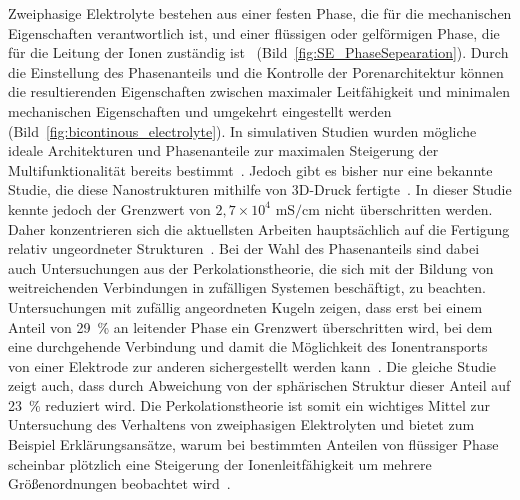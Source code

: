 Zweiphasige Elektrolyte bestehen aus einer festen Phase, die für die mechanischen Eigenschaften verantwortlich ist, und einer flüssigen oder gelförmigen Phase, die für die Leitung der Ionen zuständig ist~\cite{Ichino1995} (Bild~\ref{fig:SE_PhaseSepearation}). Durch die Einstellung des Phasenanteils und die Kontrolle der Porenarchitektur können die resultierenden Eigenschaften zwischen maximaler Leitfähigkeit und minimalen mechanischen Eigenschaften und umgekehrt eingestellt werden (Bild~\ref{fig:bicontinous_electrolyte}). In simulativen Studien wurden mögliche ideale Architekturen und Phasenanteile zur maximalen Steigerung der Multifunktionalität bereits bestimmt~\cite{Lee2019,Tu2020}. Jedoch gibt es bisher nur eine bekannte Studie, die diese Nanostrukturen mithilfe von 3D-Druck fertigte~\cite{Zekoll2018}. In dieser Studie kennte jedoch der Grenzwert von $2,7 \times 10^4$ $\si{\milli \siemens \per \cm}$ nicht überschritten werden. Daher konzentrieren sich die aktuellsten Arbeiten hauptsächlich auf die Fertigung relativ ungeordneter Strukturen~\cite{Greenhalgh2023}. Bei der Wahl des Phasenanteils sind dabei auch Untersuchungen aus der Perkolationstheorie, die sich mit der Bildung von weitreichenden Verbindungen in zufälligen Systemen beschäftigt, zu beachten. Untersuchungen mit zufällig angeordneten Kugeln zeigen, dass erst bei einem Anteil von 29~\% an leitender Phase ein Grenzwert überschritten wird, bei dem eine durchgehende Verbindung und damit die Möglichkeit des Ionentransports von einer Elektrode zur anderen sichergestellt werden kann~\cite{Li2020b}. Die gleiche Studie zeigt auch, dass durch Abweichung von der sphärischen Struktur dieser Anteil auf 23~\% reduziert wird. Die Perkolationstheorie ist somit ein wichtiges Mittel zur Untersuchung des Verhaltens von zweiphasigen Elektrolyten und bietet zum Beispiel Erklärungsansätze, warum bei bestimmten Anteilen von flüssiger Phase scheinbar plötzlich eine Steigerung der Ionenleitfähigkeit um mehrere Größenordnungen beobachtet wird~\cite{Melodia2023}.

